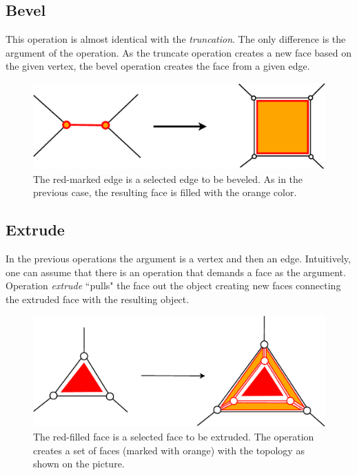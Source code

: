 \subsection{Bevel}

This operation is almost identical with the \emph{truncation}. The only difference is the argument of the
operation. As the truncate operation creates a new face based on the given vertex, the bevel operation
creates the face from a given edge.\\

\begin{figure}[ht]
\centering
\includegraphics[scale=0.2]{../img/bevel.eps}
\caption{The red-marked edge is a selected edge to be beveled. As in the previous case, the resulting
face is filled with the orange color.}
\end{figure}

\subsection{Extrude}

In the previous operations the argument is a vertex and then an edge. Intuitively, one can assume
that there is an operation that demands a face as the argument. Operation \emph{extrude} ``pulls"
the face out the object creating new faces connecting the extruded face with the resulting object.

\begin{figure}[ht]
\centering
\includegraphics[scale=0.2]{../img/extrude.eps}
\caption{The red-filled face is a selected face to be extruded. The operation creates a set of
faces (marked with orange) with the topology as shown on the picture.}
\end{figure}

